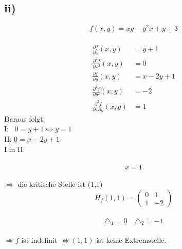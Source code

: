 \documentclass[a4paper]{scrartcl}
\begin{document}
\subsection{ii)}
\[f(x,y)=xy-y^2x+y+3\] \\
\begin{align}
\frac{\partial f}{\partial x}(x,y) &= y+1 \\
\frac{\partial ^2 f}{\partial x^2}(x,y) &= 0 \\
\frac{\partial f}{\partial y}(x,y) &= x-2y+1 \\
\frac{\partial ^2 f}{\partial y^2}(x,y) &= -2 \\
\frac{\partial ^2 f}{\partial x\partial y}(x,y) &= 1
\end{align}
Daraus folgt: \\
I: \ \(0=y+1\Leftrightarrow y=1\) \\
II: \(0=x-2y+1\) \\
I in II: \\
\\
\[x=1\] \\
\(\Rightarrow\) die kritische Stelle ist (1,1) \\
\[H_f(1,1)=\begin{pmatrix}
0 & 1 \\
1 & -2
\end{pmatrix}\] \\
\[\triangle_1 = 0\quad \triangle_2 = -1\] \\
\(\Rightarrow f\) ist indefinit \(\Leftrightarrow (1,1)\) ist keine Extremstelle. 

\newpage
\end{document}
